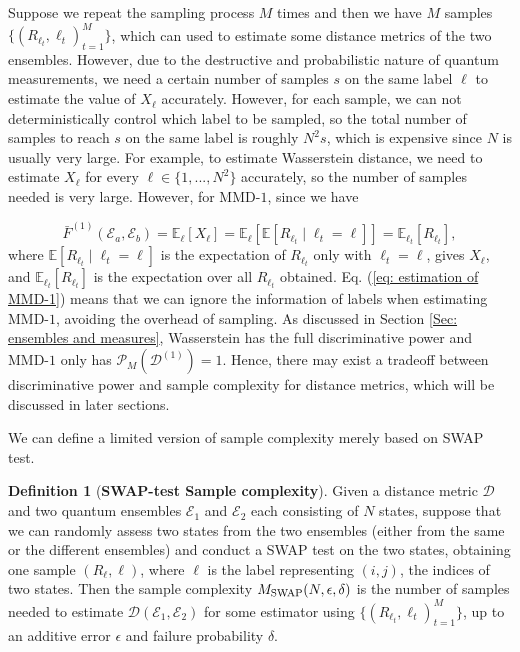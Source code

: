 \documentclass[aps,prx,reprint,superscriptaddress,amsmath,amssymb,longbibliography,floatfix]{revtex4-2}
\newcommand{\dsE}{\mathbb{E}}
\newcommand{\scD}{\mathcal{D}}
\newcommand{\scE}{\mathcal{E}}
\newcommand{\scP}{\mathcal{P}}
\theoremstyle{plain}
\theoremstyle{definition}
\newtheorem{definition}[theorem]{Definition}
\theoremstyle{remark}
\begin{document}
Suppose we repeat the sampling process $M$ times and then we have $M$ samples $\{(R_{\ell_t},\ell_t)_{t=1}^M\}$, which can used to estimate some distance metrics of the two ensembles. However, due to the destructive and probabilistic nature of quantum measurements, we need a certain number of samples $s$ on the same label $\ell$ to estimate the value of $X_{\ell}$ accurately. However, for each sample, we can not deterministically control which label to be sampled, so the total number of samples to reach $s$ on the same label is roughly $N^2s$, which is expensive since $N$ is usually very large. For example, to estimate Wasserstein distance, we need to estimate $X_{\ell}$ for every $\ell \in \{1,...,N^2\}$ accurately, so the number of samples needed is very large. However, for MMD-$1$, since we have 


\begin{equation}
    \bar{F}^{(1)}(\scE_a, \scE_b) = \dsE_{\ell}[X_{\ell}] = \dsE_{\ell}[\dsE[R_{\ell_t} \mid \ell_t=\ell]] =\dsE_{\ell_t}[R_{\ell_t}], \label{eq: estimation of MMD-1}
\end{equation}
where $\dsE[R_{\ell_t} \mid \ell_t=\ell]$ is the expectation of $R_{\ell_t}$ only with $\ell_t=\ell$, gives $X_\ell$, and $\dsE_{\ell_t}[R_{\ell_t}]$ is the expectation over all $R_{\ell_t}$ obtained. Eq. (\ref{eq: estimation of MMD-1}) means that we can ignore the information of labels when estimating MMD-$1$, avoiding the overhead of sampling. As discussed in Section \ref{Sec: ensembles and measures}, Wasserstein has the full discriminative power and MMD-$1$ only has $\scP_M(\scD^{(1)})=1$. Hence, there may exist a tradeoff between discriminative power and sample complexity for distance metrics, which will be discussed in later sections.

We can define a limited version of sample complexity merely based on SWAP test.
\begin{definition}[\textbf{SWAP-test Sample complexity}]
    Given a distance metric $\scD$ and two quantum ensembles $\scE_1$ and $\scE_2$ each consisting of $N$ states, suppose that we can randomly assess two states from the two ensembles (either from the same or the different ensembles) and conduct a SWAP test on the two states, obtaining one sample $(R_{\ell},\ell)$, where $\ell$ is the label representing $(i,j)$, the indices of two states. Then the sample complexity $M_{\rm SWAP}(N,\epsilon,\delta)$ is the number of samples needed to estimate $\scD(\scE_1, \scE_2)$ for some estimator using $\{(R_{\ell_t},\ell_t)_{t=1}^M\}$, up to an additive error $\epsilon$ and failure probability $\delta$.\label{def: sample complexity}
\end{definition}
\end{document}
